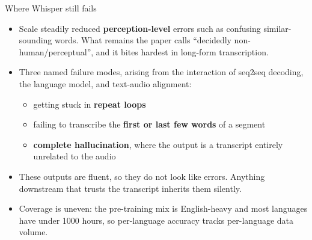 \begin{frame}{Where Whisper still fails}
  \begin{itemize}\footnotesize
    \item Scale steadily reduced \textbf{perception-level} errors such as confusing similar-sounding words. What remains the paper calls ``decidedly non-human/perceptual'', and it bites hardest in long-form transcription.
    \item Three named failure modes, arising from the interaction of seq2seq decoding, the language model, and text-audio alignment:
      \begin{itemize}
        \item getting stuck in \textbf{repeat loops}
        \item failing to transcribe the \textbf{first or last few words} of a segment
        \item \textbf{complete hallucination}, where the output is a transcript entirely unrelated to the audio
      \end{itemize}
    \item These outputs are fluent, so they do not look like errors. Anything downstream that trusts the transcript inherits them silently.
    \item Coverage is uneven: the pre-training mix is English-heavy and most languages have under 1000 hours, so per-language accuracy tracks per-language data volume.
  \end{itemize}
\end{frame}
